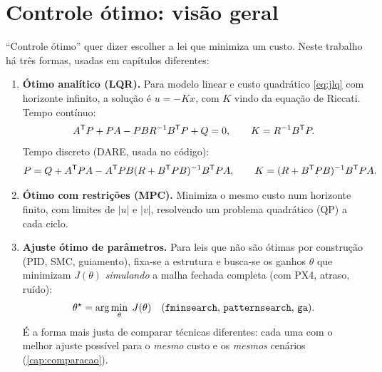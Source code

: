 \section{Controle ótimo: visão geral}
\label{sec:otimo}
``Controle ótimo'' quer dizer escolher a lei que minimiza um custo. Neste trabalho há
três formas, usadas em capítulos diferentes:
\begin{enumerate}
  \item \textbf{Ótimo analítico (LQR).} Para modelo linear e custo quadrático
        \eqref{eq:jlq} com horizonte infinito, a solução é $u=-Kx$, com $K$ vindo da
        equação de Riccati. Tempo contínuo:
        \begin{equation}
          A^{\mathsf{T}} P + PA - PBR^{-1}B^{\mathsf{T}} P + Q = 0,\qquad K = R^{-1}B^{\mathsf{T}} P .
        \end{equation}
        Tempo discreto (DARE, usada no código):
        \begin{equation}
          P = Q + A^{\mathsf{T}} P A - A^{\mathsf{T}} P B (R + B^{\mathsf{T}} P B)^{-1} B^{\mathsf{T}} P A,\qquad
          K = (R + B^{\mathsf{T}} P B)^{-1} B^{\mathsf{T}} P A .
          \label{eq:dare}
        \end{equation}
  \item \textbf{Ótimo com restrições (MPC).} Minimiza o mesmo custo num horizonte finito,
        com limites de $|u|$ e $|v|$, resolvendo um problema quadrático (QP) a cada ciclo.
  \item \textbf{Ajuste ótimo de parâmetros.} Para leis que não são ótimas por
        construção (PID, SMC, guiamento), fixa-se a estrutura e busca-se os ganhos
        $\theta$ que minimizam $J(\theta)$ \emph{simulando} a malha fechada completa
        (com PX4, atraso, ruído):
        \begin{equation}
          \theta^\star = \arg\min_\theta\; J(\theta)
          \quad\text{(\texttt{fminsearch}, \texttt{patternsearch}, \texttt{ga}).}
        \end{equation}
        É a forma mais justa de comparar técnicas diferentes: cada uma com o melhor
        ajuste possível para o \emph{mesmo} custo e os \emph{mesmos} cenários
        (\cref{cap:comparacao}).
\end{enumerate}
